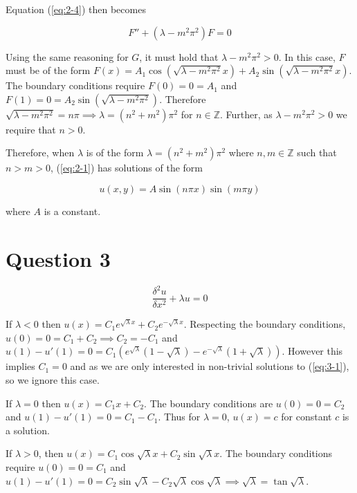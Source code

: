 \documentclass{article}
\newcommand\pdsq[2]{\frac{\delta^2{#1}}{\delta{#2}^2}}
\begin{document}
\hfill \break
Equation (\ref{eq:2-4}) then becomes

\begin{equation} \label{eq:2-5}
    F'' + (\lambda - m^2\pi^2)F = 0
\end{equation}

Using the same reasoning for $G$, it must hold that $\lambda - m^2\pi^2 > 0$. In this case, $F$
must be of the form $F(x) = A_1\cos(\sqrt{\lambda - m^2\pi^2}x) + A_2\sin(\sqrt{\lambda - m^2\pi^2}x)$.
The boundary conditions require $F(0) = 0 = A_1$ and $F(1) = 0 = A_2\sin(\sqrt{\lambda - m^2\pi^2})$. Therefore
$\sqrt{\lambda - m^2\pi^2} = n\pi \implies \lambda = (n^2 + m^2)\pi^2$ for $n \in \mathbb{Z}$. Further,
as $\lambda - m^2\pi^2 > 0$ we require that $n > 0$.

\hfill \break
Therefore, when $\lambda$ is of the form $\lambda = (n^2 + m^2)\pi^2$ where $n, m \in \mathbb{Z}$
such that $n > m > 0$, (\ref{eq:2-1}) has solutions of the form

\begin{equation} \label{eq:2-6}
    u(x, y) = A\sin(n\pi x)\sin(m\pi y)
\end{equation}

where $A$ is a constant.

\section*{Question 3}

\begin{equation} \label{eq:3-1}
    \pdsq{u}{x} + \lambda u = 0
\end{equation}

If $\lambda < 0$ then $u(x) = C_1e^{\sqrt{\lambda}x} + C_2e^{-\sqrt{\lambda}x}$. Respecting the
boundary conditions, $u(0) = 0 = C_1 + C_2 \implies C_2 = -C_1$ and
$u(1) - u'(1) = 0 = C_1(e^{\sqrt{\lambda}}(1 - \sqrt{\lambda}) - e^{-\sqrt{\lambda}}(1 + \sqrt{\lambda}))$.
However this implies $C_1 = 0$ and as we are only interested in non-trivial solutions to (\ref{eq:3-1}), so we
ignore this case.

\hfill \break
If $\lambda = 0$ then $u(x) = C_1x + C_2$. The boundary conditions are $u(0) = 0 = C_2$ and
$u(1) - u'(1) = 0 = C_1 - C_1$. Thus for $\lambda = 0$, $u(x) = c$ for constant $c$ is a solution.

\hfill \break
If $\lambda > 0$, then $u(x) = C_1\cos\sqrt{\lambda}x + C_2\sin\sqrt{\lambda}x$. The boundary conditions
require $u(0) = 0 = C_1$ and
$u(1) - u'(1) = 0 = C_2\sin\sqrt{\lambda} - C_2\sqrt{\lambda}\cos\sqrt{\lambda} \implies
\sqrt{\lambda} = \tan\sqrt{\lambda}$.
\end{document}
